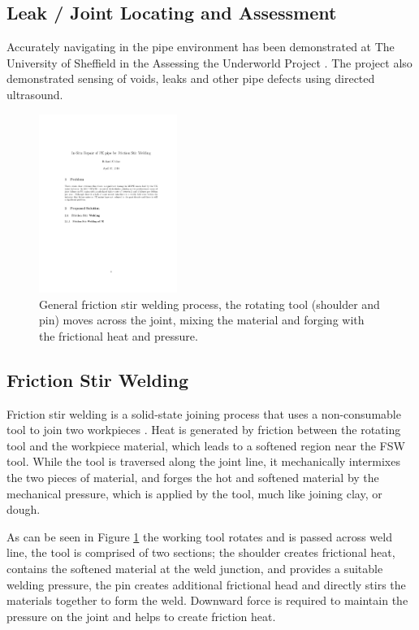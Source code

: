 \documentclass[	DIV=calc,%
							paper=a4,%
							fontsize=11pt,%
							twocolumn]{scrartcl}	 					%
\begin{document}
\subsection*{Leak / Joint Locating  and Assessment}
Accurately navigating in the pipe environment has been demonstrated at The 
University of Sheffield in the Assessing the Underworld Project 
\cite{ma2017pipeslam}. 
The project also demonstrated sensing of voids, leaks and other pipe 
defects using directed ultrasound.

\begin{figure}[htp]
 \centering
 \includegraphics[width = 0.4\textwidth]{FrictionStirWeld}
 \caption{General friction stir welding process, the rotating tool (shoulder and 
pin) moves across the joint, mixing the material and forging with the frictional 
heat and pressure.}
 \label{FSWProcess}
\end{figure}

\subsection*{Friction Stir Welding}
Friction stir welding is a solid-state joining process that uses a 
non-consumable tool to join two workpieces \cite{mishra2005friction}. 
Heat is 
generated by friction between the rotating tool and the workpiece material, 
which leads to a softened region near the FSW tool. 
While the tool is traversed 
along the joint line, it mechanically intermixes the two pieces of material, and 
forges the hot and softened material by the mechanical pressure, which is 
applied by the tool, much like joining clay, or dough.




As can be seen in Figure \ref{FSWProcess} the working tool rotates and is passed 
across  weld line, the tool is comprised of two sections; the shoulder creates 
frictional heat, contains the softened material at the weld junction, and 
provides a suitable welding pressure,  the pin creates additional frictional 
head and directly stirs the materials together to form the weld.
Downward force is required to maintain the pressure on the joint and helps to create friction heat.
\end{document}
